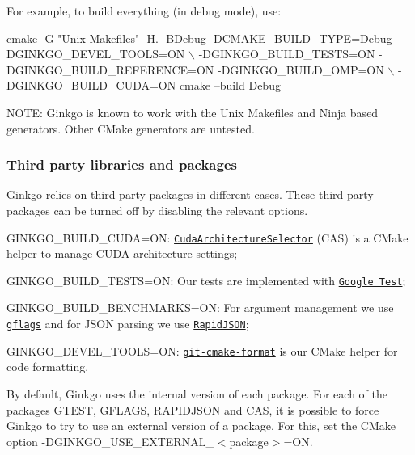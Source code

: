 For example, to build everything (in debug mode), use\+:


\begin{DoxyCode}
cmake  -G "Unix Makefiles" -H. -BDebug -DCMAKE\_BUILD\_TYPE=Debug -DGINKGO\_DEVEL\_TOOLS=ON \(\backslash\)
      -DGINKGO\_BUILD\_TESTS=ON -DGINKGO\_BUILD\_REFERENCE=ON -DGINKGO\_BUILD\_OMP=ON \(\backslash\)
      -DGINKGO\_BUILD\_CUDA=ON 
cmake --build Debug
\end{DoxyCode}


N\+O\+TE\+: Ginkgo is known to work with the {\ttfamily Unix Makefiles} and {\ttfamily Ninja} based generators. Other C\+Make generators are untested.

\subsubsection*{Third party libraries and packages}

Ginkgo relies on third party packages in different cases. These third party packages can be turned off by disabling the relevant options.


\begin{DoxyItemize}
\item G\+I\+N\+K\+G\+O\+\_\+\+B\+U\+I\+L\+D\+\_\+\+C\+U\+DA=ON\+: \href{https://github.com/ginkgo-project/CudaArchitectureSelector}{\tt Cuda\+Architecture\+Selector} (C\+AS) is a C\+Make helper to manage C\+U\+DA architecture settings;
\item G\+I\+N\+K\+G\+O\+\_\+\+B\+U\+I\+L\+D\+\_\+\+T\+E\+S\+TS=ON\+: Our tests are implemented with \href{https://github.com/google/googletest}{\tt Google Test};
\item G\+I\+N\+K\+G\+O\+\_\+\+B\+U\+I\+L\+D\+\_\+\+B\+E\+N\+C\+H\+M\+A\+R\+KS=ON\+: For argument management we use \href{https://github.com/gflags/gflags}{\tt gflags} and for J\+S\+ON parsing we use \href{https://github.com/Tencent/rapidjson}{\tt Rapid\+J\+S\+ON};
\item G\+I\+N\+K\+G\+O\+\_\+\+D\+E\+V\+E\+L\+\_\+\+T\+O\+O\+LS=ON\+: \href{https://github.com/gflegar/git-cmake-format}{\tt git-\/cmake-\/format} is our C\+Make helper for code formatting.
\end{DoxyItemize}

By default, Ginkgo uses the internal version of each package. For each of the packages {\ttfamily G\+T\+E\+ST}, {\ttfamily G\+F\+L\+A\+GS}, {\ttfamily R\+A\+P\+I\+D\+J\+S\+ON} and {\ttfamily C\+AS}, it is possible to force Ginkgo to try to use an external version of a package. For this, set the C\+Make option {\ttfamily -\/\+D\+G\+I\+N\+K\+G\+O\+\_\+\+U\+S\+E\+\_\+\+E\+X\+T\+E\+R\+N\+A\+L\+\_\+$<$package$>$=ON}.

